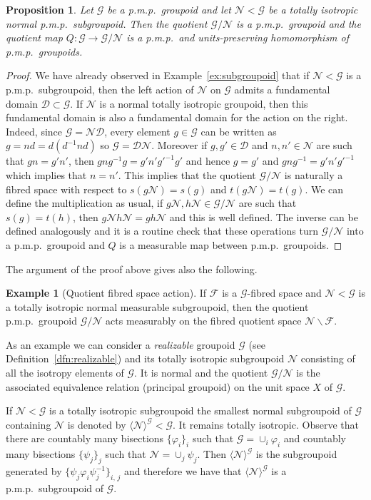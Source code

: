 \documentclass[10pt]{amsart}
\newtheorem{prop}[cdrthm]{Proposition}
\theoremstyle{definition}
\newtheorem{exam}[cdrthm]{Example}
\newcommand{\cn}{\mathcal{N}}
\newcommand{\cg}{\mathcal{G}}
\newcommand{\cf}{\mathcal{F}}
\newcommand{\cd}{\mathcal{D}}
\newcommand{\ph}{\varphi}
\newcommand{\pmp}{p.m.p.\ }
\begin{document}
\begin{prop}\label{prop: quot groupoid}
Let $\cg$ be a \pmp groupoid and let $\cn<\cg$ be a totally isotropic normal \pmp subgroupoid. Then the quotient $\cg/\cn$ is a \pmp grou\-poid and the quotient map $Q:\cg\rightarrow \cg/\cn$ is a \pmp and units-preserving homomorphism of \pmp groupoids.
\end{prop}
\begin{proof}
We have already observed in Example~\ref{ex:subgroupoid} that if $\cn<\cg$ is a \pmp subgroupoid, then the left action of $\cn$ on $\cg$ admits a fundamental domain $\cd\subset \cg$. If $\cn$ is a normal totally isotropic groupoid, then this fundamental domain is also a fundamental domain for the action on the right. Indeed, since $\cg = \cn \cd$, every element $g \in \cg$ can be written as $g = nd = d (d^{-1} n d)$ so $\cg = \cd \cn$. Moreover if $g,g'\in \cd$ and $n,n'\in \cn$ are such that $gn=g'n'$, then $gng^{-1}g=g' n'g'^{-1}g'$ and hence $g=g'$ and $gng^{-1}=g'n'g'^{-1}$ which implies that $n=n'$. This implies that the quotient $\cg/\cn$ is naturally a fibred space with respect to $s(g\cn)=s(g)$ and $t(g\cn)=t(g)$. We can define the multiplication as usual, if $g\cn,h\cn\in\cg/\cn$ are such that $s(g)=t(h)$, then $g\cn h\cn=gh\cn$ and this is well defined. The inverse can be defined analogously and it is a routine check that these operations turn $\cg/\cn$ into a \pmp groupoid and $Q$ is a measurable map between \pmp groupoids.
\end{proof}

The argument of the proof above gives also the following.

\begin{exam}[Quotient fibred space action]\label{ex: quotient fibred space}
If $\cf$ is a $\cg$-fibred space and $\cn<\cg$ is a totally isotropic normal measurable subgroupoid, then the quotient \pmp groupoid $\cg/\cn$ acts measurably on the fibred quotient space $\cn\backslash \cf$.
\end{exam}

As an example we can consider a \emph{realizable} groupoid $\cg$ (see Definition~\ref{dfn:realizable}) and its totally isotropic subgroupoid $\cn$ consisting of all the isotropy elements of $\cg$. It is normal and the quotient $\cg/\cn$ is the associated equivalence relation (principal groupoid) on the unit space $X$ of $\cg$.

If $\cn<\cg$ is a totally isotropic subgroupoid the smallest normal subgroupoid of $\cg$ containing $\cn$ is denoted by $\langle\cn\rangle^\cg <\cg$. It remains totally isotropic. Observe that there are countably many bisections $\{\ph_i\}_i$ such that $\cg=\cup_i \ph_i$ and countably many bisections $\{\psi_j\}_j$ such that $\cn=\cup_j \psi_j$. Then $\langle\cn\rangle^\cg$ is the subgroupoid generated by $\{\psi_j\ph_i\psi_j^{-1}\}_{i,\,j}$ and therefore we have that $\langle\cn\rangle^\cg$ is a \pmp subgroupoid of $\cg$.
\end{document}
